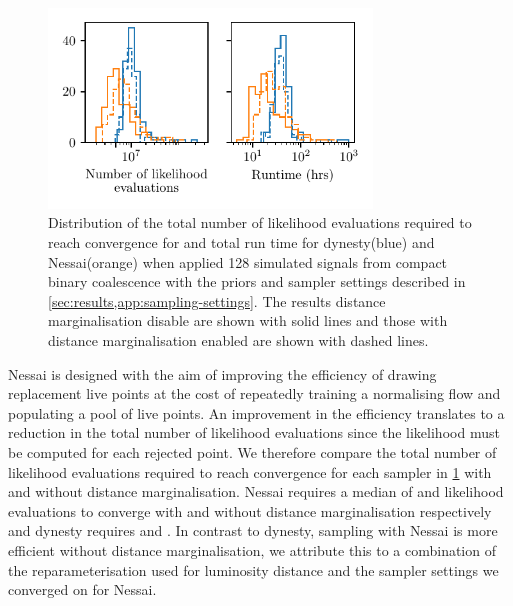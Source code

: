 \documentclass[%
 reprint,
nofootinbib,
 amsmath,amssymb,
 aps,
 prd,
]{revtex4-2}
\newcommand{\nessai}{{\sc Nessai}\xspace}
\newcommand{\dynesty}{{\sc dynesty}\xspace}
\newcommand{\figwidth}{8.6cm}
\begin{document}
\begin{figure}
    \centering
    \includegraphics[width=\figwidth]{figures/likelihood_evaluations.pdf}
    \caption{Distribution of the total number of likelihood evaluations required to reach convergence for and total run time for  \dynesty (blue) and \nessai (orange) when applied 128 simulated signals from compact binary coalescence with the priors and sampler settings described in \cref{sec:results,app:sampling-settings}. The results distance marginalisation disable are shown with solid lines and those with distance marginalisation enabled are shown with dashed lines.}
    \label{fig:comparison}
    
\end{figure}

\nessai is designed with the aim of improving the efficiency of drawing replacement live points at the cost of repeatedly training a normalising flow and populating a pool of live points. An improvement in the efficiency translates to a reduction in the total number of likelihood evaluations since the likelihood must be computed for each rejected point. We therefore compare the total number of likelihood evaluations required to reach convergence for each sampler in \cref{fig:comparison} with and without distance marginalisation. \nessai requires a median of \nessaievaluations and \nessaievaluationsmarg likelihood evaluations to converge with and without distance marginalisation respectively and \dynesty requires \dynestyevaluations and \dynestyevaluationsmarg.  In contrast to \dynesty, sampling with \nessai is more efficient without distance marginalisation, we attribute this to a combination of the reparameterisation used for luminosity distance and the sampler settings we converged on for \nessai.
\end{document}
